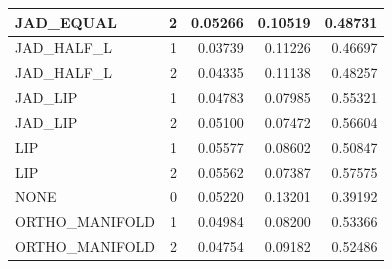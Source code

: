 \begin{table}
\begin{tabular}{lrrrr}
JAD\_EQUAL & 2 & 0.05266 & 0.10519 & 0.48731 \\
\hline
JAD\_HALF\_L & 1 & 0.03739 & 0.11226 & 0.46697 \\
JAD\_HALF\_L & 2 & 0.04335 & 0.11138 & 0.48257 \\
\hline
JAD\_LIP & 1 & 0.04783 & 0.07985 & 0.55321 \\
JAD\_LIP & 2 & 0.05100 & 0.07472 & 0.56604 \\
\hline
LIP & 1 & 0.05577 & 0.08602 & 0.50847 \\
LIP & 2 & 0.05562 & 0.07387 & 0.57575 \\
\hline
NONE & 0 & 0.05220 & 0.13201 & 0.39192 \\
\hline
ORTHO\_MANIFOLD & 1 & 0.04984 & 0.08200 & 0.53366 \\
ORTHO\_MANIFOLD & 2 & 0.04754 & 0.09182 & 0.52486 \\
\bottomrule
\end{tabular}
\end{table}